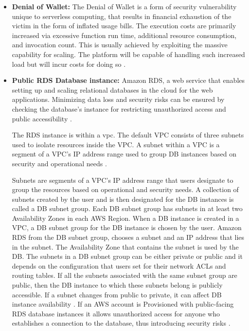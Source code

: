 \begin{itemize}
    \item \textbf{Denial of Wallet:} The Denial of Wallet is a form of security vulnerability unique to serverless
    computing,
    that results in financial exhaustion of the victim in the form of inflated usage bills.
    The execution costs are
    primarily increased via excessive function run time, additional resource consumption, and invocation count.
    This
    is usually achieved by exploiting the massive capability for scaling.
    The platform will be capable of handling
    such increased load but will incur costs for doing so
    \cite{63} \cite{64} \cite{65}.
\end{itemize}

\begin{itemize}
    \item \textbf{Public RDS Database instance:} Amazon RDS, a web service that enables setting up and scaling
    relational databases in the cloud for the web applications.
    Minimizing data loss and security risks can be
    ensured by checking the database’s instance for
    restricting unauthorized access and public
    accessibility \cite{66}.

    The RDS instance is within a \gls{vpc}.
    The default VPC consists of three subnets used to 
    isolate resources inside the VPC. A subnet within a 
    VPC is a segment of a VPC's IP address range used to 
    group DB instances based on security and operational 
    needs \cite{67}.

    Subnets are segments of a VPC's IP address range that users designate to group the resources based on operational and security needs.
    A collection of subnets created by the user and is then designated for the DB instances is called a DB subnet group.
    Each DB subnet group has subnets in at least two
    Availability Zones in each AWS Region.
    When a DB instance is created in a VPC, a DB subnet group for the DB instance is chosen by the user.
    Amazon RDS from the DB subnet group, chooses a subnet
    and an IP address that lies in the subnet.
    The Availability Zone that contains the subnet is
    used by the DB. The subnets in a DB subnet group can
    be either private or public and it depends on the
    configuration that users set for their network ACLs
    and routing tables.
    If all the subnets associated with the same subnet group are public, then the DB instance to which these subnets belong is publicly accessible.
    If a subnet changes from public to private, it can affect DB instance availability \cite{67}.
    If an AWS account is Provisioned with public-facing RDS database instances it allows unauthorized access for anyone who establishes a connection to the database, thus introducing security risks \cite{68}.
\end{itemize}


